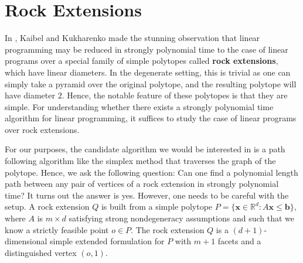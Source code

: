 \documentclass[centering,11pt,reqno]{amsart}
\theoremstyle{definition}
\begin{document}




\section{Rock Extensions}

In \cite{RockExtensions}, Kaibel and Kukharenko made the stunning observation that linear programming may be reduced in strongly polynomial time to the case of linear programs over a special family of simple polytopes called \textbf{rock extensions}, which have linear diameters. In the degenerate setting, this is trivial as one can simply take a pyramid over the original polytope, and the resulting polytope will have diameter $2$. Hence, the notable feature of these polytopes is that they are simple. For understanding whether there exists a strongly polynomial time algorithm for linear programming, it suffices to study the case of linear programs over rock extensions.


For our purposes, the candidate algorithm we would be interested in is a path following algorithm like the simplex method that traverses the graph of the polytope. Hence, we ask the following question: Can one find a polynomial length path between any pair of vertices of a rock extension in strongly polynomial time? It turns out the answer is yes. However, one needs to be careful with the setup. A rock extension $Q$ is built from a simple polytope $P = \{\mathbf{x} \in \mathbb{R}^{d}: A \mathbf{x} \leq \mathbf{b}\}$, where $A$ is $m \times d$ satisfying strong nondegeneracy assumptions and such that we know a strictly feasible point $o \in P$. The rock extension $Q$ is a $(d+1)$-dimensional simple extended formulation for $P$ with $m+1$ facets and a distinguished vertex $(o,1)$. 
\end{document}
